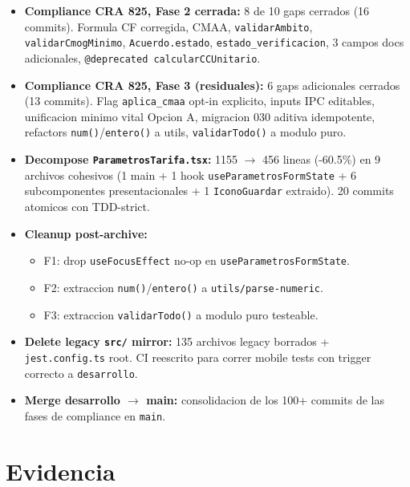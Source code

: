 \documentclass[11pt,a4paper,oneside]{report}
\begin{document}
\begin{itemize}[leftmargin=*]
    \item \textbf{Compliance CRA 825, Fase 2 cerrada:} 8 de 10 gaps cerrados (16 commits). Formula CF corregida, CMAA, \texttt{validarAmbito}, \texttt{validarCmogMinimo}, \texttt{Acuerdo.estado}, \texttt{estado\_verificacion}, 3 campos docs adicionales, \texttt{@deprecated calcularCCUnitario}.
    \item \textbf{Compliance CRA 825, Fase 3 (residuales):} 6 gaps adicionales cerrados (13 commits). Flag \texttt{aplica\_cmaa} opt-in explicito, inputs IPC editables, unificacion minimo vital Opcion A, migracion 030 aditiva idempotente, refactors \texttt{num()}/\texttt{entero()} a utils, \texttt{validarTodo()} a modulo puro.
    \item \textbf{Decompose \texttt{ParametrosTarifa.tsx}:} 1155 $\to$ 456 lineas (-60.5\%) en 9 archivos cohesivos (1 main + 1 hook \texttt{useParametrosFormState} + 6 subcomponentes presentacionales + 1 \texttt{IconoGuardar} extraido). 20 commits atomicos con TDD-strict.
    \item \textbf{Cleanup post-archive:}
    \begin{itemize}
        \item F1: drop \texttt{useFocusEffect} no-op en \texttt{useParametrosFormState}.
        \item F2: extraccion \texttt{num()}/\texttt{entero()} a \texttt{utils/parse-numeric}.
        \item F3: extraccion \texttt{validarTodo()} a modulo puro testeable.
    \end{itemize}
    \item \textbf{Delete legacy \texttt{src/} mirror:} 135 archivos legacy borrados + \texttt{jest.config.ts} root. CI reescrito para correr mobile tests con trigger correcto a \texttt{desarrollo}.
    \item \textbf{Merge desarrollo $\to$ main:} consolidacion de los 100+ commits de las fases de compliance en \texttt{main}.
\end{itemize}

\section{Evidencia}
\end{document}

